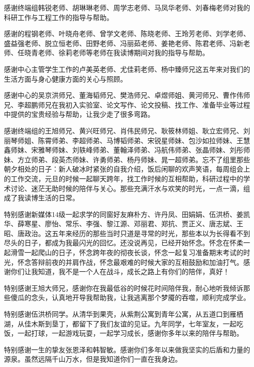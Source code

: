 感谢终端组韩锐老师、胡琳琳老师、周学志老师、马凤华老师、刘春梅老师对我的科研工作与工程工作的指导与帮助。

感谢的程钢老师、叶晓舟老师、曾学文老师、陈晓老师、王玲芳老师、刘学老师、盛益强老师、脱立恒老师、田野老师、冯丽茹老师、姜艳老师、陈君老师、冯新老师、任晓青老师、徐莉老师等老师在我读博期间对我的指导与帮助。

感谢中心主管学生工作的卢美英老师、尤佳莉老师、杨中臻师兄这五年来对我们的生活方面与身心健康方面的关心与照顾。

感谢中心的吴京洪师兄、董海韬师兄、樊浩师兄、卓煜师姐、黄河师兄、曹作伟师兄、李超鹏师兄在我初入实验室、论文写作、论文投稿、找工作、准备毕业等过程中提供的宝贵经验与帮助，让我少走了很多弯路。

感谢终端组的王旭师兄、黄兴旺师兄、肖伟民师兄、耿筱林师姐、耿立宏师兄、刘丽琴师姐、陈霄师弟、李超师弟、马博韬师弟、宋锐星师妹、包沙如拉师妹、王慧鑫师妹、宋雅琴师妹、刘轶峰师弟、董翰泽师弟、冯航伟师弟、张晶师妹、刘彤师妹、方立师弟、段英杰师妹、许勇师弟、杨丹师妹、晁一超师弟。忘不了组里那些朝夕相处的日子：新人破冰时紧张的自我介绍，饭后闲聊的欢声笑语，每周组会上的工作交流，元旦的时候一起聊天跨年，找工作时候的互相帮助，科研过程中的学术讨论、迷茫无助时候的陪伴与关心。那些充满汗水与欢笑的时光，一点一滴，组成了我读博生活的日常。


特别感谢新媒体14级一起求学的同窗好友麻朴方、许丹凤、田娟娟、伍洪桥、姜凯华、薛寒星、廖怡、常乐、李强、黎江源、邓丽君、郑抗、贾正义、唐志斌、王昭、唐政治。这五年来经历的那些当时只道是寻常的时光，那些本以为长得看不到尽头的日子，都成为我最闪光的回忆。还没说再见，已经开始怀念。怀念在怀柔一起滑雪一起爬山的日子，怀念跨年夜的彻夜长谈，怀念一起复习准备期末考试的时光，怀念答辩前夜的并肩作战，怀念最艰难的时候大家的互相鼓励和加油打气。感谢你们让我知道，我不是一个人在战斗，成长之路上有你们的陪伴，真好！

特别感谢王旭大师兄，感谢你在我最低谷的时候花时间陪伴我，耐心地听我倾诉那些傻瓜的念头，认真地开导我帮助我，让我逃离那个梦魇的吞噬，顺利完成学业。

特别感谢伍洪桥同学。从清华到果壳，从紫荆公寓到青年公寓，从五道口到雁栖湖，从佳木斯到垦丁，都留下了我们友谊的见证。九年同学，七年室友，一起吃饭，一起打球，一起游戏玩耍，一起学习成长，感谢你多年以来的陪伴与帮助。

特别感谢一生的挚友张恩泽和韩智敏。感谢你们多年以来做我坚实的后盾和力量的源泉。虽然远隔千山万水，但是我知道你们一直在我身边。

